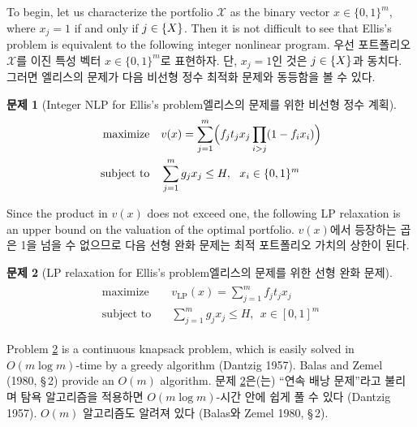 \documentclass[11pt]{article} %
\theoremstyle{definition}
\newtheorem{problem}{Problem}
\theoremstyle{definition}
\newtheorem{problem}{문제}
\begin{document}
\ifen
To begin, let us characterize the portfolio $\mathcal{X}$ as the binary vector $x \in \{0, 1\}^m$, where $x_j = 1 $ if and only if $j \in \mathcal\{X\}$. Then it is not difficult to see that Ellis's problem is equivalent to the following integer nonlinear program. 
\else
우선 포트폴리오 $\mathcal{X}$를 이진 특성 벡터 $x \in \{0, 1\}^m$로 표현하자. 단, $x_j = 1 $인 것은 $j \in \mathcal\{X\}$과 동치다. 그러면 엘리스의 문제가 다음 비선형 정수 최적화 문제와 동등함을 볼 수 있다.
\fi
\begin{problem}[\ifen Integer NLP for Ellis's problem\else 엘리스의 문제를 위한 비선형 정수 계획\fi] \label{integernlp}
\begin{align}
\begin{split}
\text{maximize}\quad &  v(x) = \sum_{j=1}^m \Bigl(f_j t_j  x_j \prod_{i > j} (1 - f_{i} x_i) \Bigr)\\
\text{subject to}\quad & \sum_{j=1}^m g_j x_j \leq H, ~~ x_i \in \{0, 1\}^m
\end{split}
\end{align}
\end{problem}
\ifen
\noindent Since the product in $v(x)$ does not exceed one, the following LP relaxation is an upper bound on the valuation of the optimal portfolio.
\else
\noindent $v(x)$에서 등장하는 곱은 1을 넘을 수 없으므로 다음 선형 완화 문제는 최적 포트폴리오 가치의 상한이 된다.
\fi
\begin{problem}[\ifen LP relaxation for Ellis's problem\else 엘리스의 문제를 위한 선형 완화 문제\fi] \label{LPrelaxation}
\begin{align}
\begin{split}
\text{maximize}\quad &  v_{\mathrm{LP}}(x) = \sum_{j=1}^m  f_j t_j x_j \\
\text{subject to}\quad & \sum_{j=1}^m g_j x_j \leq H, ~~ x \in [0, 1]^m
\end{split}
\end{align}
\end{problem}
\ifen
\noindent Problem \ref{LPrelaxation} is a continuous knapsack problem, which is easily solved in $O(m \log m)$-time by a greedy algorithm (Dantzig 1957). Balas and Zemel (1980, \S\,2) provide an $O(m)$ algorithm. 
\else
\noindent 문제 \ref{LPrelaxation}은(는) ``연속 배낭 문제''라고 불리며 탐욕 알고리즘을 적용하면 $O(m \log m)$-시간 안에 쉽게 풀 수 있다 (Dantzig 1957).  $O(m)$ 알고리즘도 알려져 있다 (Balas와 Zemel 1980, \S\,2).
\fi
\end{document}
